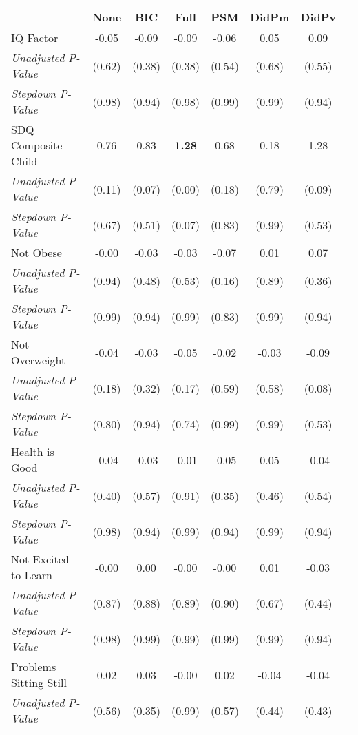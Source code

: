 \begin{tabular}{l c c c c c c c}
\toprule
 & None & BIC & Full & PSM & DidPm & DidPv \\
\midrule
IQ Factor & -0.05 & -0.09 & -0.09 & -0.06 & 0.05 & 0.09 \\
\quad \textit{Unadjusted P-Value} & (0.62) & (0.38) & (0.38) & (0.54) & (0.68) & (0.55) \\
\quad \textit{Stepdown P-Value} & (0.98) & (0.94) & (0.98) & (0.99) & (0.99) & (0.94) \\
SDQ Composite - Child & 0.76 & 0.83 & \textbf{ 1.28 } & 0.68 & 0.18 & 1.28 \\
\quad \textit{Unadjusted P-Value} & (0.11) & (0.07) & (0.00) & (0.18) & (0.79) & (0.09) \\
\quad \textit{Stepdown P-Value} & (0.67) & (0.51) & (0.07) & (0.83) & (0.99) & (0.53) \\
Not Obese & -0.00 & -0.03 & -0.03 & -0.07 & 0.01 & 0.07 \\
\quad \textit{Unadjusted P-Value} & (0.94) & (0.48) & (0.53) & (0.16) & (0.89) & (0.36) \\
\quad \textit{Stepdown P-Value} & (0.99) & (0.94) & (0.99) & (0.83) & (0.99) & (0.94) \\
Not Overweight & -0.04 & -0.03 & -0.05 & -0.02 & -0.03 & -0.09 \\
\quad \textit{Unadjusted P-Value} & (0.18) & (0.32) & (0.17) & (0.59) & (0.58) & (0.08) \\
\quad \textit{Stepdown P-Value} & (0.80) & (0.94) & (0.74) & (0.99) & (0.99) & (0.53) \\
Health is Good & -0.04 & -0.03 & -0.01 & -0.05 & 0.05 & -0.04 \\
\quad \textit{Unadjusted P-Value} & (0.40) & (0.57) & (0.91) & (0.35) & (0.46) & (0.54) \\
\quad \textit{Stepdown P-Value} & (0.98) & (0.94) & (0.99) & (0.94) & (0.99) & (0.94) \\
Not Excited to Learn & -0.00 & 0.00 & -0.00 & -0.00 & 0.01 & -0.03 \\
\quad \textit{Unadjusted P-Value} & (0.87) & (0.88) & (0.89) & (0.90) & (0.67) & (0.44) \\
\quad \textit{Stepdown P-Value} & (0.98) & (0.99) & (0.99) & (0.99) & (0.99) & (0.94) \\
Problems Sitting Still & 0.02 & 0.03 & -0.00 & 0.02 & -0.04 & -0.04 \\
\quad \textit{Unadjusted P-Value} & (0.56) & (0.35) & (0.99) & (0.57) & (0.44) & (0.43) \\

\end{tabular}
